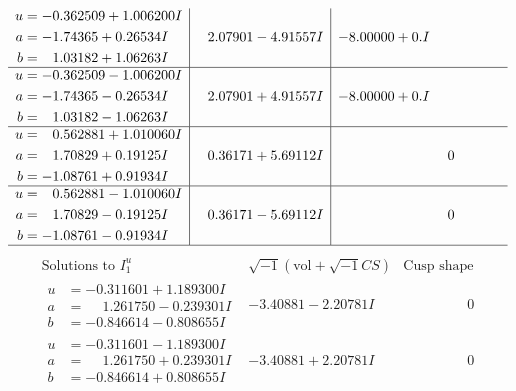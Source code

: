 \documentclass[1p]{elsarticle_modified}
\theoremstyle{definition}
\newcommand{\I}{\sqrt{-1}}
\begin{document}
$$\begin{array}{c|c|c}
\begin{aligned}
u &= -0.362509 + 1.006200 I \\
a &= -1.74365 + 0.26534 I \\
b &= \phantom{-}1.03182 + 1.06263 I\end{aligned}
 & \phantom{-}2.07901 - 4.91557 I & -8.00000 + 0. I\phantom{ +0.000000I} \\ \hline\begin{aligned}
u &= -0.362509 - 1.006200 I \\
a &= -1.74365 - 0.26534 I \\
b &= \phantom{-}1.03182 - 1.06263 I\end{aligned}
 & \phantom{-}2.07901 + 4.91557 I & -8.00000 + 0. I\phantom{ +0.000000I} \\ \hline\begin{aligned}
u &= \phantom{-}0.562881 + 1.010060 I \\
a &= \phantom{-}1.70829 + 0.19125 I \\
b &= -1.08761 + 0.91934 I\end{aligned}
 & \phantom{-}0.36171 + 5.69112 I & \phantom{-0.000000 } 0 \\ \hline\begin{aligned}
u &= \phantom{-}0.562881 - 1.010060 I \\
a &= \phantom{-}1.70829 - 0.19125 I \\
b &= -1.08761 - 0.91934 I\end{aligned}
 & \phantom{-}0.36171 - 5.69112 I & \phantom{-0.000000 } 0\\
 \hline 
 \end{array}$$\newpage$$\begin{array}{c|c|c}  
\text{Solutions to }I^u_{1}& \I (\text{vol} + \sqrt{-1}CS) & \text{Cusp shape}\\
 \hline 
\begin{aligned}
u &= -0.311601 + 1.189300 I \\
a &= \phantom{-}1.261750 - 0.239301 I \\
b &= -0.846614 - 0.808655 I\end{aligned}
 & -3.40881 - 2.20781 I & \phantom{-0.000000 } 0 \\ \hline\begin{aligned}
u &= -0.311601 - 1.189300 I \\
a &= \phantom{-}1.261750 + 0.239301 I \\
b &= -0.846614 + 0.808655 I\end{aligned}
 & -3.40881 + 2.20781 I & \phantom{-0.000000 } 0 \\ \hline\begin{aligned}

\end{aligned}
\end{array}$$
\end{document}
